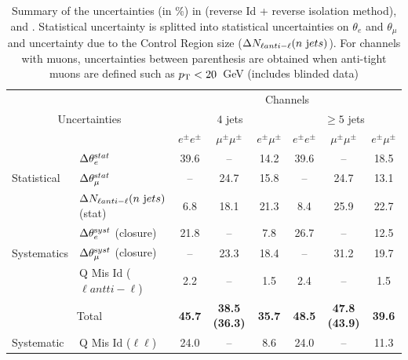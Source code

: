 \begin{table}
  \begin{center} 
{\small \begin{tabular}{|l|l|ccc|ccc|}
\hline \multicolumn{2}{|c|}{ } &  \multicolumn{6}{c|}{Channels} \\ \cline{3-8}
 \multicolumn{2}{|c|}{Uncertainties} &  \multicolumn{3}{c|}{$4$ jets} &  \multicolumn{3}{|c|}{$\ge 5$ jets} \\ \cline{3-8}
\multicolumn{2}{|c|}{} & $e^{\pm}e^{\pm}$ & $\mu^{\pm}\mu^{\pm}$ & $e^{\pm}\mu^{\pm}$ & $e^{\pm}e^{\pm}$ & $\mu^{\pm}\mu^{\pm}$ & $e^{\pm}\mu^{\pm}$  \\ \hline\hline

    &  $\Delta\theta_{e}^{\rm stat}$ & 39.6 & -- & 14.2 & 39.6 & -- & 18.5 \\ \cline{2-8}
   Statistical    &  $\Delta\theta_{\mu}^{\rm stat}$ & -- & 24.7 & 15.8 & -- & 24.7 & 13.1 \\ \cline{2-8}
    &  $\Delta N_{\ell anti-\ell}(n~ {\rm jets})$(stat) & 6.8 & 18.1 & 21.3 & 8.4 & 25.9 & 22.7 \\ \hline

    &  $\Delta\theta_{e}^{\rm syst}$ (closure) & 21.8 & -- & 7.8 & 26.7 & -- & 12.5 \\ \cline{2-8}
Systematics    &  $\Delta\theta_{\mu}^{\rm syst}$ (closure) & -- & 23.3 & 18.4 & -- & 31.2 & 19.7 \\ \cline{2-8}
    & Q Mis Id ($\ell antti-\ell$) & 2.2 & -- & 1.5 & 2.4 & -- & 1.5 \\ \hline

\multicolumn{2}{|c|}{Total} &\bf 45.7 &\bf 38.5 (36.3) &\bf 35.7 &\bf 48.5 &\bf 47.8 (43.9) &\bf 39.6 \\ \hline
Systematic    & Q Mis Id ($\ell\ell$) & 24.0 & -- & 8.6 & 24.0 & -- & 11.3 \\ \hline
\hline \end{tabular}}
\caption{ Summary of the uncertainties (in \%) in \ee (reverse Id + reverse isolation
  method), \mumu and \emu. Statistical uncertainty is splitted into statistical
  uncertainties on $\theta_{e}$ and $\theta_{\mu}$ and uncertainty due to the
  Control Region size ($\Delta N_{\ell anti-{\ell}}(n~ {\rm jets})$). For channels with muons, uncertainties
  between parenthesis are obtained when anti-tight muons are defined such as
  $p_{\rm T}<20$~GeV (includes blinded data) \label{tab:uncertainties}}
\end{center}  
 \end{table}


